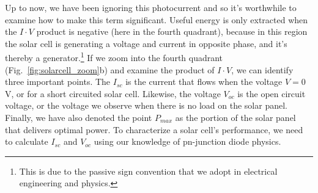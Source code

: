 Up to now, we have been ignoring this photocurrent and so it's worthwhile to examine how to make this term significant.  Useful energy is only extracted when the $I\cdot V$ product is negative (here in the fourth quadrant), because in this region the solar cell is generating a voltage and current in opposite phase, and it's thereby a generator.\footnote{This is due to the passive sign convention that we adopt in electrical engineering and physics.}  If we zoom into the fourth quadrant (Fig.~\ref{fig:solarcell_zoom}b) and examine the product of $I\cdot V$, we can identify three important points.  The $I_{sc}$ is the current that flows when the voltage $V = 0$V, or for a short circuited solar cell.  Likewise, the voltage $V_{oc}$ is the open circuit voltage, or the voltage we observe when there is no load on the solar panel.  Finally, we have also denoted the point $P_{max}$ as the portion of the solar panel that delivers optimal power.
To characterize a solar cell's performance, we need to calculate $I_{sc}$ and $V_{oc}$ using our knowledge of pn-junction diode physics.
